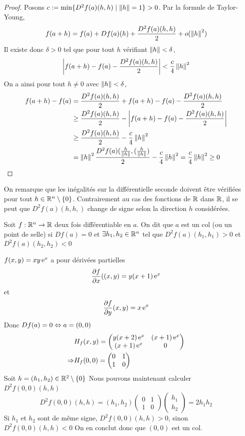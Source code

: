 \begin{proof}
    Posons $c:=\min \{D^2f(a)(h,h) \mid \left\| h \right\| = 1\} >0$.
    Par la formule de Taylor-Young,$$f(a+h) = f(a) + Df(a)(h) + \frac{D^2f(a)(h,h)}{2} + o(\left\| h \right\|^2)$$
    Il existe donc $\delta >0$ tel que pour tout $h$ vérifiant $\left\| h \right\| <\delta$, 
    $$\left| f(a+h) - f(a) - \frac{D^2f(a)(h,h)}{2} \right|<\frac c 4 \left\| h \right\| ^2$$
    On a ainsi pour tout $h\ne 0$ avec $\left\| h \right\| <\delta$,
    \begin{align*}
        f(a+h)-f(a) &= \frac{D^2f(a)(h,h)}{2} + f(a+h)-f(a)-\frac{D^2f(a)(h,h)}{2}\\
        &\ge \frac{D^2f(a)(h,h)}{2}  - \left| f(a+h)-f(a)-\frac{D^2f(a)(h,h)}{2} \right|\\
        &\ge \frac{D^2f(a)(h,h)}{2} - \frac c 4 \left\| h \right\| ^2\\
        & = \left\| h \right\| ^2\frac{D^2f(a)(\frac{h}{\left\| h \right\| },(\frac{h}{\left\| h \right\| })}{2}- \frac c 4 \left\| h \right\| ^2 = \frac c 4 \left\| h \right\| ^2\ge 0
    \end{align*}
\end{proof}
On remarque que les inégalités sur la différentielle seconde doivent être vérifiées pour tout $h\in\mathbb{R}^n\setminus\{0\}$. Contrairement au cas des fonctions de $\mathbb{R}$ dans $\mathbb{R}$, il se peut que $D^2f(a)(h,h,)$ change de signe selon la direction $h$ considérées.
\begin{definition}
    Soit $f:\mathbb{R}^n\to\mathbb{R}$ deux fois différentiable en $a$. On dit que $a$ est un col (ou un point de selle) si $Df(a) = 0$ et $\exists h_1,h_2\in\mathbb{R}^n$ tel que 
    $D^2f(a)(h_1,h_1) >0 $ et $D^2f(a)(h_2,h_2) <0 $
\end{definition}
\begin{exemple}
    $f(x,y) = xy\operatorname{e}^x$ a pour dérivées partielles $$\frac{\partial f}{\partial x}((x,y) = y(x+1)\operatorname{e}^x $$ et $$\frac{\partial f}{\partial y}(x,y) = x\operatorname{e}^x$$
    Donc $Df(a) = 0\Leftrightarrow a = (0,0)$
    \begin{align*}
        &H_f(x,y) = \begin{pmatrix}
            y(x+2)\operatorname{e}^x & (x+1)\operatorname{e}^x\\
            (x+1)\operatorname{e}^x & 0
        \end{pmatrix}\\
        \Rightarrow & H_f(0,0) = \begin{pmatrix}
            0 & 1\\
            1 & 0
        \end{pmatrix}     
    \end{align*}
    Soit $h = (h_1, h_2) \in \mathbb{R}^2\setminus\{0\}$ Nous pouvons maintenant calculer $D^2f(0,0)(h,h)$
    $$D^2f(0,0)(h,h) = (h_1,h_2)\begin{pmatrix} 
        0 & 1\\
        1 & 0
    \end{pmatrix}\begin{pmatrix}
        h_1\\
        h_2
    \end{pmatrix} = 2h_1h_2$$
    Si $h_1$ et $h_2$ sont de même signe, $D^2f(0,0)(h,h) > 0$, sinon $D^2 f(0,0)(h,h) < 0$ 
    On en conclut donc que $(0,0)$ est un col.
\end{exemple}

